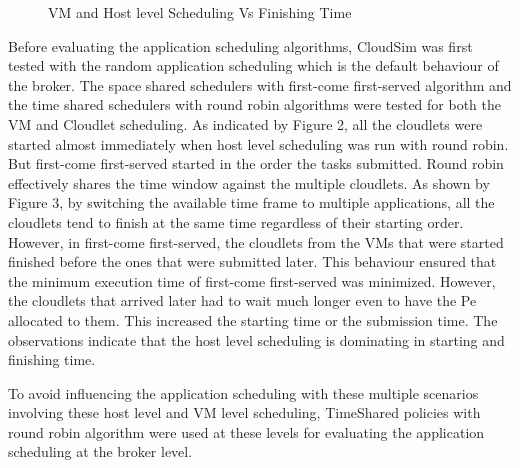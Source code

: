 \documentclass[times, 10pt,twocolumn]{article}
\begin{document}
\begin{figure}[ht]
 \caption{VM and Host level Scheduling Vs Finishing Time}
 \label{fig:finish}
\end{figure}
Before evaluating the application scheduling algorithms, CloudSim was first tested with the random application scheduling which is the default behaviour of the broker. The space shared schedulers with first-come first-served algorithm and the time shared schedulers with round robin algorithms were tested for both the VM and Cloudlet scheduling. As indicated by Figure 2, all the cloudlets were started almost immediately when host level scheduling was run with round robin. But first-come first-served started in the order the tasks submitted. Round robin effectively shares the time window against the multiple cloudlets. As shown by Figure 3, by switching the available time frame to multiple applications, all the cloudlets tend to finish at the same time regardless of their starting order. However, in first-come first-served, the cloudlets from the VMs that were started finished before the ones that were submitted later. This behaviour ensured that the minimum execution time of first-come first-served was minimized. However, the cloudlets that arrived later had to wait much longer even to have the Pe allocated to them. This increased the starting time or the submission time. The observations indicate that the host level scheduling is dominating in starting and finishing time.

To avoid influencing the application scheduling with these multiple scenarios involving these host level and VM level scheduling, TimeShared policies with round robin algorithm were used at these levels for evaluating the application scheduling at the broker level.
\end{document}
